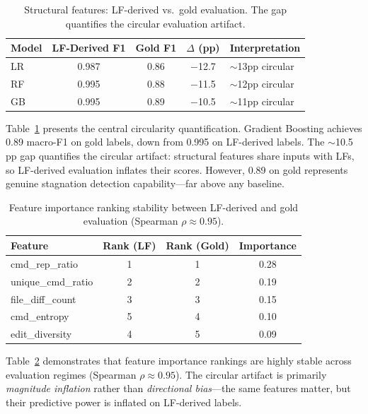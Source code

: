 \documentclass[11pt,a4paper]{article}
\begin{document}
\begin{table}[t]
\centering
\small
\begin{tabular}{lcccl}
\toprule
Model & LF-Derived F1 & Gold F1 & $\Delta$ (pp) & Interpretation \\
\midrule
LR & 0.987 & 0.86 & $-$12.7 & $\sim$13pp circular \\
RF & 0.995 & 0.88 & $-$11.5 & $\sim$12pp circular \\
GB & 0.995 & 0.89 & $-$10.5 & $\sim$11pp circular \\
\bottomrule
\end{tabular}
\caption{Structural features: LF-derived vs.\ gold evaluation. The gap quantifies the circular evaluation artifact.}
\label{tab:structural-gold}
\end{table}

Table~\ref{tab:structural-gold} presents the central circularity quantification.
Gradient Boosting achieves 0.89 macro-F1 on gold labels, down from 0.995 on LF-derived labels.
The $\sim$10.5\,pp gap quantifies the circular artifact: structural features share inputs with LFs, so LF-derived evaluation inflates their scores.
However, 0.89 on gold represents genuine stagnation detection capability---far above any baseline.

\begin{table}[t]
\centering
\small
\begin{tabular}{lccc}
\toprule
Feature & Rank (LF) & Rank (Gold) & Importance \\
\midrule
cmd\_rep\_ratio & 1 & 1 & 0.28 \\
unique\_cmd\_ratio & 2 & 2 & 0.19 \\
file\_diff\_count & 3 & 3 & 0.15 \\
cmd\_entropy & 5 & 4 & 0.10 \\
edit\_diversity & 4 & 5 & 0.09 \\
\bottomrule
\end{tabular}
\caption{Feature importance ranking stability between LF-derived and gold evaluation (Spearman $\rho \approx 0.95$).}
\label{tab:feature-importance}
\end{table}

Table~\ref{tab:feature-importance} demonstrates that feature importance rankings are highly stable across evaluation regimes (Spearman $\rho \approx 0.95$).
The circular artifact is primarily \emph{magnitude inflation} rather than \emph{directional bias}---the same features matter, but their predictive power is inflated on LF-derived labels.
\end{document}

